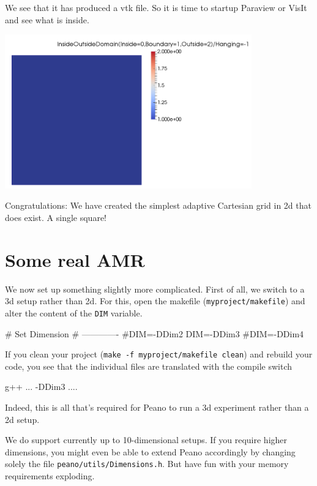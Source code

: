 \noindent
We see that it has produced a vtk file. So it is time to startup Paraview or
VisIt and see what is inside.

\begin{center}
  \includegraphics[width=0.8\textwidth]{2_quickstart/screenshot00.png}
\end{center}

\noindent
Congratulations: We have created the simplest adaptive Cartesian grid in 2d that
does exist. A single square!


\section{Some real AMR}

We now set up something slightly more complicated. 
First of all, we switch to a 3d setup rather than 2d. 
For this, open the makefile (\texttt{myproject/makefile}) and alter the
content of the \texttt{DIM} variable.

\begin{code}
# Set Dimension
# -------------
#DIM=-DDim2
DIM=-DDim3
#DIM=-DDim4
\end{code}

\noindent
If you clean your project (\texttt{make -f myproject/makefile clean}) and
rebuild your code, you see that the individual files are translated with the
compile switch 

\begin{code}
g++ ... -DDim3 ....
\end{code}

\noindent
Indeed, this is all that's required for Peano to run a 3d experiment rather than
a 2d setup. 

\begin{remark}
We do support currently up to 10-dimensional setups. If you require higher
dimensions, you might even be able to extend Peano accordingly by changing
solely the file \texttt{peano/utils/Dimensions.h}. But have fun with your memory
requirements exploding.
\end{remark}


